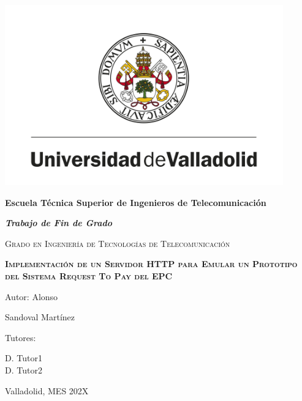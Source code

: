 \documentclass{article}
\begin{document}

\begin{titlepage}
    \centering
    {\includegraphics[width=0.9\textwidth]{Imagenes/Universidad-de-Valladolid.png}}\par
    {\bfseries\Large Escuela Técnica Superior de Ingenieros de Telecomunicación\par}
    \vspace{0.5cm}
    {\bfseries\itshape\Large Trabajo de Fin de Grado \par}
    \vspace{0.5cm}
    {\scshape Grado en Ingeniería de Tecnologías de Telecomunicación \par}
    \vspace{0.5cm}
    {\bfseries\scshape\Large Implementación de un Servidor HTTP para Emular un Prototipo del Sistema Request To Pay del EPC \par}
    \vspace{1.5cm}
    { Autor: Alonso\\}
    { Sandoval Martínez \par}
    { Tutores:\\}
    { D. Tutor1 \\ D. Tutor2 \par}
    \vspace{0.5cm} {Valladolid, MES 202X \par}
\end{titlepage}


\newpage
\tableofcontents

\newpage

\end{document}
